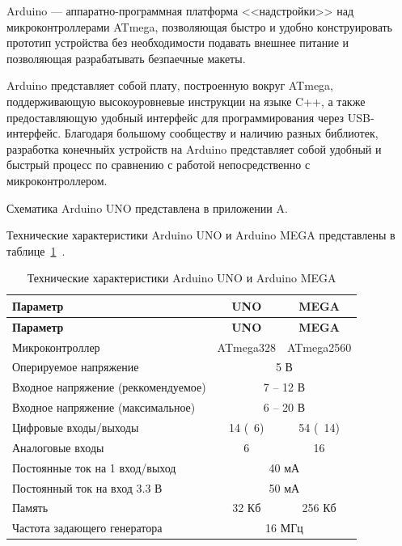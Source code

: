Arduino --- аппаратно-программная платформа <<надстройки>> над микроконтроллерами ATmega, позволяющая быстро и удобно конструировать прототип устройства без необходимости подавать внешнее питание и позволяющая разрабатывать безпаечные макеты.

Arduino представляет собой плату, построенную вокруг ATmega, поддерживающую высокоуровневые инструкции на языке C++, а также предоставляющую удобный интерфейс для программирования через USB-интерфейс. Благодаря большому сообществу и наличию разных библиотек, разработка конечныйх устройств на Arduino представляет собой удобный и быстрый процесс по сравнению с работой непосредственно с микроконтроллером.

Схематика Arduino UNO представлена в приложении A.

Технические характеристики Arduino UNO и Arduino MEGA представлены в таблице~\ref{tab:megatech}~\cite{arduino:mega, arduino:uno}.

\begin{longtable}[c]{|p{2in}|c|c|}
    \caption{Технические характеристики Arduino UNO и Arduino MEGA}
    \label{tab:megatech}\\
    \hline
    \textbf{Параметр} & \textbf{UNO} & \textbf{MEGA}\\
    \hline
    \endfirsthead
    \hline
    \textbf{Параметр} & \textbf{UNO} & \textbf{MEGA}\\
    \hline
    \endhead
        Микроконтроллер & ATmega328 & ATmega2560\\
        \hline
        Оперируемое напряжение & \multicolumn{2}{c|}{5 В}\\
        \hline
        Входное напряжение (реккомендуемое) & \multicolumn{2}{c|}{7 -- 12 В}\\
        \hline
        Входное напряжение (максимальное) & \multicolumn{2}{c|}{6 -- 20 В}\\
        \hline
        Цифровые входы/выходы & 14 (~6) & 54 (~14)\\
        \hline
        Аналоговые входы & 6 & 16\\
        \hline
        Постоянные ток на 1 вход/выход & \multicolumn{2}{c|}{40 мА}\\
        \hline
        Постоянный ток на вход 3.3 В & \multicolumn{2}{c|}{50 мА}\\
        \hline
        Память & 32 Кб & 256 Кб\\
        \hline
        Частота задающего генератора & \multicolumn{2}{c|}{16 МГц}\\
        \hline
\end{longtable}

